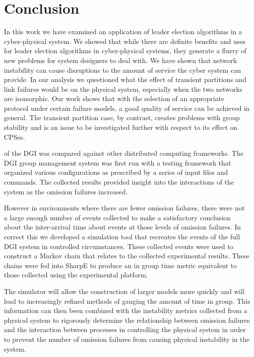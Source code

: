 \chapter{Conclusion}

In this work we have examined an application of leader election algorithms in a
cyber-physical system. We showed that while there are definite benefits and
uses for leader election algorithms in cyber-physical systems, they generate a
flurry of new problems for system designers to deal with. We have shown that
network instability can cause disruptions to the amount of service the cyber
system can provide. In our analysis we questioned what the effect of transient
partitions and link failures would be on the physical system, especially when
the two networks are isomorphic. Our work shows that with the selection of an
appropriate protocol under certain failure models, a good quality of service
can be achieved in general. The transient partition case, by contrast, creates
problems with group stability and is an issue to be investigated further with
respect to its effect on CPSes.

of the DGI was compared against other distributed computing frameworks. The DGI group management system was first run with a testing framework that organized various configurations as prescribed by a series of input files and commands. The collected results provided insight into the interactions of the system as the omission failures increased.

However in environments where there are fewer omission failures, there were not a large enough number of events collected to make a satisfactory conclusion about the inter-arrival time about events at those levels of omission failures. In correct this we developed a simulation tool that recreates the events of the full DGI system in controlled circumstances. These collected events were used to construct a Markov chain that relates to the collected experimental results. These chains were fed into SharpE to produce an in group time metric equivalent to those collected using the experimental platform.

The simulator will allow the construction of larger models more quickly and will lead to increasingly refined methods of gauging the amount of time in group. This information can then been combined with the instability metrics collected from a physical system to rigorously determine the relationship between omission failures and the interaction between processes in controlling the physical system in order to prevent the number of omission failures from causing physical instability in the system.

